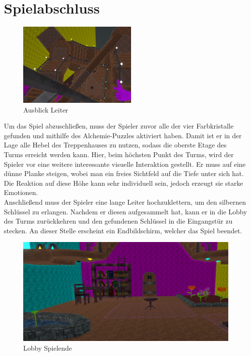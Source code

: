 \section{Spielabschluss}
\begin{figure}
	\vspace*{-0.5cm}
	\includegraphics[width=5.9cm]{Pictures/Ausblick_Leiter}
	\caption{Ausblick Leiter}
	\vspace*{-0.5cm}
	\label{fig:leiter}
\end{figure}
Um das Spiel abzuschließen, muss der Spieler zuvor alle der vier Farbkristalle gefunden und mithilfe des Alchemie-Puzzles aktiviert haben. Damit ist er in der Lage alle Hebel des Treppenhauses zu nutzen, sodass die oberste Etage des Turms erreicht werden kann. Hier, beim höchsten Punkt des Turms, wird der Spieler vor eine weitere interessante visuelle Interaktion gestellt. Er muss auf eine dünne Planke steigen, wobei man ein freies Sichtfeld auf die Tiefe unter sich hat. Die Reaktion auf diese Höhe kann sehr individuell sein, jedoch erzeugt sie starke Emotionen.\\
Anschließend muss der Spieler eine lange Leiter hochzuklettern, um den silbernen Schlüssel zu erlangen. Nachdem er diesen aufgesammelt hat, kann er in die Lobby des Turms zurückkehren und den gefundenen Schlüssel in die Eingangstür zu stecken. An dieser Stelle erscheint ein Endbildschirm, welcher das Spiel beendet.
\begin{figure}[h]
	\centering
	\includegraphics[width=\textwidth/2]{Pictures/Lobby_Final}
	\caption{Lobby Spielende}
	\label{fig:lobby_final}
\end{figure}
\newpage

